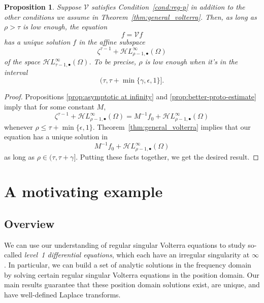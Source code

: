 \documentclass{article}
\theoremstyle{definition}
\theoremstyle{plain}
\newtheorem{prop}{Proposition}
\newcommand{\singexp}[2]{\mathcal{H}L^\infty_{#1, #2}}
\newcommand{\singexpalg}[1]{\singexp{#1}{\bullet}}
\newcommand{\volterra}{\mathcal{V}}
\newcommand{\solproto}{f_0}
\newcommand{\domain}{\Omega}
\begin{document}
\begin{prop}\label{prop:alt-general_volterra}
Suppose $\volterra$ satisfies {\em Condition~\eqref{cond:reg-p}} in addition to the other conditions we assume in {\em Theorem~\ref{thm:general_volterra}}. Then, as long as $\rho > \tau$ is low enough, the equation
\[f = \volterra f\]
has a unique solution $f$ in the affine subspace
\[ \zeta^{\tau-1}+\singexpalg{\rho-1}(\domain) \]
of the space $\singexpalg{\tau-1}(\domain)$. To be precise, $\rho$ is low enough when it's in the interval
\[ (\tau, \tau + \min\{\gamma, \epsilon, 1\}]. \]
\end{prop}

\begin{proof}
Propositions \ref{prop:asymptotic at infinity} and \ref{prop:better-proto-estimate} imply that for some constant $M$,
\[ \zeta^{\tau-1} + \singexpalg{\rho-1}(\domain) = M^{-1}\solproto + \singexpalg{\rho-1}(\domain) \]
whenever $\rho \le \tau + \min\{\epsilon, 1\}$. Theorem~\ref{thm:general_volterra} implies that our equation has a unique solution in
\[ M^{-1}\solproto + \singexpalg{\rho-1}(\domain) \]
as long as $\rho \in (\tau, \tau + \gamma]$. Putting these facts together, we get the desired result.
\end{proof}
\section{A motivating example}\label{sec:example}
\subsection{Overview}
We can use our understanding of regular singular Volterra equations to study so-called \textit{level~1 differential equations}, which each have an irregular singularity at $\infty$. In particular, we can build a set of analytic solutions in the frequency domain by solving certain regular singular Volterra equations in the position domain. Our main results guarantee that these position domain solutions exist, are unique, and have well-defined Laplace transforms.
\end{document}
